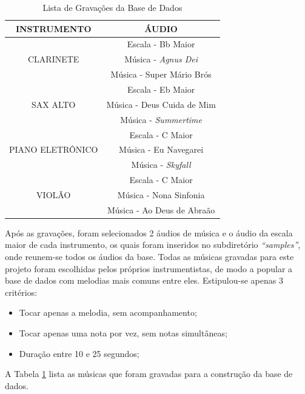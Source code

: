\begin{table}[h!]
	\centering
	\caption{Lista de Gravações da Base de Dados} 	\label{table-songs}
	\begin{tabular}{|c|c|}
		\hline
		\textbf{INSTRUMENTO}       & \textbf{ÁUDIO}             \\ \hline
		\multirow{3}{*}{CLARINETE} & Escala - Bb Maior         \\ \cline{2-2} 
		& Música - \textit{Agnus Dei}         \\ \cline{2-2} 
		& Música - Super Mário Brós  \\ \hline
		\multirow{3}{*}{SAX ALTO}  & Escala - Eb Maior           \\ \cline{2-2} 
		& Música - Deus Cuida de Mim \\ \cline{2-2} 
		& Música - \textit{Summertime}        \\ \hline
		\multirow{3}{*}{PIANO ELETRÔNICO}     & Escala - C Maior           \\ \cline{2-2} 
		& Música - Eu Navegarei      \\ \cline{2-2} 
		& Música - \textit{Skyfall}         \\ \hline
		\multirow{3}{*}{VIOLÃO}    & Escala - C Maior           \\ \cline{2-2} 
		& Música - Nona Sinfonia     \\ \cline{2-2} 
		& Música - Ao Deus de Abraão \\ \hline
	\end{tabular}
\end{table}

Após as gravações, foram selecionados 2 áudios de música e o áudio da escala maior de cada instrumento, os quais foram inseridos no subdiretório \textit{``samples''}, onde reunem-se todos os áudios da base. Todas as músicas gravadas para este projeto foram escolhidas pelos próprios instrumentistas, de modo a popular a base de dados com melodias mais comuns entre eles. Estipulou-se apenas 3 critérios:

\begin{itemize}
	\item Tocar apenas a melodia, sem acompanhamento;
	\item Tocar apenas uma nota por vez, sem notas simultâneas;
	\item Duração entre 10 e 25 segundos;
\end{itemize}


A Tabela \ref{table-songs} lista as músicas que foram gravadas para a construção da base de dados.



